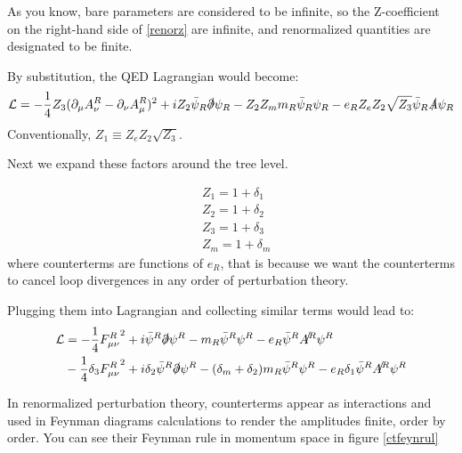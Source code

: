\documentclass[11pt]{article}
\begin{document}
As you know, bare parameters are considered to be infinite, so the Z-coefficient on the right-hand side of \ref{renorz} are infinite, and renormalized quantities are designated to be finite.

By substitution, the QED Lagrangian would become:
\[
\mathcal{L} = -\frac14 Z_3 (\partial_\mu A_\nu^R -\partial_\nu A_\mu^R )^2 + iZ_2 \bar{\psi}_R \slashed{\partial} \psi_R - Z_2Z_m m_R  \bar{\psi}_R  \psi_R - e_R Z_e Z_2 \sqrt{Z_3}  \bar{\psi}_R \slashed{A} \psi_R
\]
Conventionally, $Z_1 \equiv Z_e Z_2 \sqrt{Z_3}$.

Next we expand these factors around the tree level.

\begin{equation*}
	\begin{aligned}
		&Z_1 = 1+\delta_1 \\&
		Z_2 = 1+\delta_2 \\&
		Z_3 = 1+\delta_3 \\&
		Z_m = 1+\delta_m
	\end{aligned}
\end{equation*}
where counterterms are functions of $e_R$, that is because we want the counterterms to cancel loop divergences in any order of perturbation theory.

Plugging them into Lagrangian and collecting similar terms would lead to:
\begin{equation*}
	\begin{aligned}
		\mathcal{L} &= -\frac14 {F_{\mu\nu}^R}^2+ i\bar{\psi}^R \slashed{\partial}\psi^R - m_R \bar{\psi}^R \psi^R -e_R \bar{\psi}^R \slashed{A^R}\psi^R
		\\& 
		-\frac14 \delta_3{F_{\mu\nu}^R}^2+ i\delta_2\bar{\psi}^R \slashed{\partial}\psi^R -(\delta_m+\delta_2) m_R \bar{\psi}^R \psi^R -e_R \delta_1\bar{\psi}^R \slashed{A^R}\psi^R
	\end{aligned}
\end{equation*}

In renormalized perturbation theory, counterterms appear as interactions and used in Feynman diagrams calculations to render the amplitudes finite, order by order. You can see their Feynman rule in momentum space in figure \ref{ctfeynrul}
\end{document}
